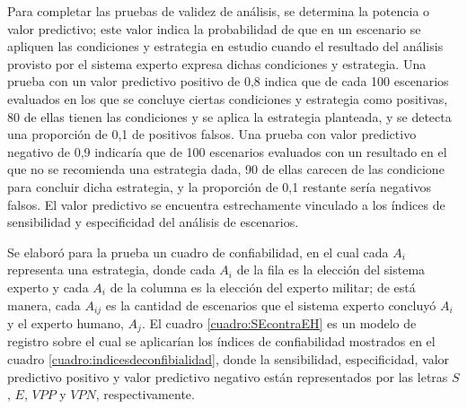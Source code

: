 Para completar las pruebas de validez de análisis, se determina la potencia o valor predictivo; este valor indica la probabilidad de que en un escenario se apliquen las condiciones y estrategia en estudio cuando el resultado del análisis provisto por el sistema experto expresa dichas condiciones y estrategia. Una prueba con un valor predictivo positivo de 0,8 indica que de cada 100 escenarios evaluados en los que se concluye ciertas condiciones y estrategia como positivas, 80 de ellas tienen las condiciones y se aplica la estrategia planteada, y se detecta una proporción de 0,1 de positivos falsos. Una prueba con valor predictivo negativo de 0,9 indicaría que de 100 escenarios evaluados con un resultado en el que no se recomienda una estrategia dada, 90 de ellas carecen de las condicione para concluir dicha estrategia, y la proporción de 0,1 restante sería negativos falsos. El valor predictivo se encuentra estrechamente vinculado a los índices de sensibilidad y especificidad del análisis de escenarios.

Se elaboró para la prueba un cuadro de confiabilidad, en el cual cada $A_i$ representa una estrategia, donde cada $A_i$ de la fila es la elección del sistema experto y cada $A_i$ de la columna es la elección del experto militar; de está manera, cada $A_{ij}$ es la cantidad de escenarios que el sistema experto concluyó $A_i$ y el experto humano, $A_j$. El cuadro \ref{cuadro:SEcontraEH} es un modelo de registro sobre el cual se aplicarían los índices de confiabilidad mostrados en el cuadro \ref{cuadro:indicesdeconfibialidad}, donde la sensibilidad, especificidad, valor predictivo positivo y valor predictivo negativo están representados por las letras $S$, $E$, $VPP$ y $VPN$, respectivamente.

